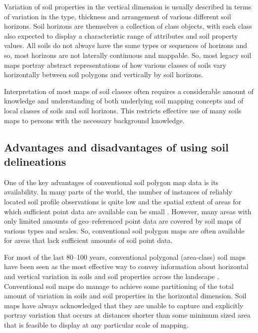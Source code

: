 \documentclass[11pt]{krantz}
\theoremstyle{definition}
\theoremstyle{definition}
\theoremstyle{definition}
\theoremstyle{remark}
\begin{document}
Variation of soil properties in the vertical dimension is usually
described in terms of variation in the type, thickness and arrangement
of various different soil horizons. Soil horizons are themselves a
collection of class objects, with each class also expected to display a
characteristic range of attributes and soil property values. All soils
do not always have the same types or sequences of horizons and so, most
horizons are not laterally continuous and mappable. So, most legacy soil
maps portray abstract representations of how various classes of soils
vary horizontally between soil polygons and vertically by soil horizons.

Interpretation of most maps of soil classes often requires a
considerable amount of knowledge and understanding of both underlying
soil mapping concepts and of local classes of soils and soil horizons.
This restricts effective use of many soils maps to persons with the
necessary background knowledge.

\hypertarget{advantages-and-disadvantages-of-using-soil-delineations}{%
\subsection{Advantages and disadvantages of using soil
delineations}\label{advantages-and-disadvantages-of-using-soil-delineations}}

One of the key advantages of conventional soil polygon map data is its
availability. In many parts of the world, the number of instances of
reliably located soil profile observations is quite low and the spatial
extent of areas for which sufficient point data are available can be
small \citep{Hartemink2008SMD}. However, many areas with only limited
amounts of geo--referenced point data are covered by soil maps of
various types and scales. So, conventional soil polygon maps are often
available for areas that lack sufficient amounts of soil point data.

For most of the last 80--100 years, conventional polygonal (area-class)
soil maps have been seen as the most effective way to convey information
about horizontal and vertical variation in soils and soil properties
across the landscape \citep{Wysocki2005Geoderma}. Conventional soil maps
do manage to achieve some partitioning of the total amount of variation
in soils and soil properties in the horizontal dimension. Soil maps have
always acknowledged that they are unable to capture and explicitly
portray variation that occurs at distances shorter than some minimum
sized area that is feasible to display at any particular scale of
mapping.
\end{document}
